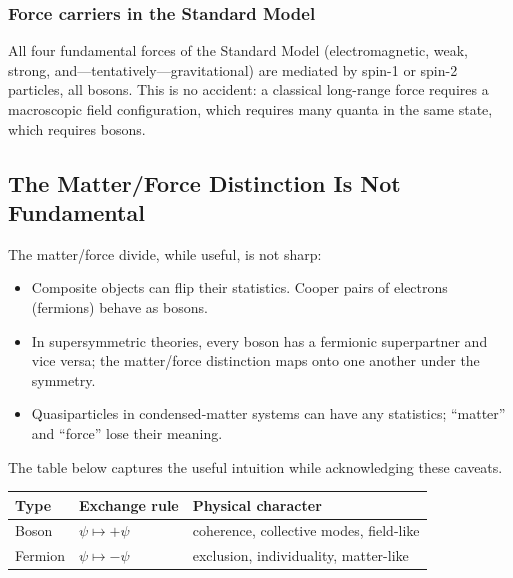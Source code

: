 \documentclass[11pt,a4paper]{article}
\begin{document}
\subsubsection{Force carriers in the Standard Model}

All four fundamental forces of the Standard Model (electromagnetic,
weak, strong, and---tentatively---gravitational) are mediated by spin-1 or
spin-2 particles, all bosons.  This is no accident: a classical long-range
force requires a macroscopic field configuration, which requires many quanta
in the same state, which requires bosons.

\subsection{The Matter/Force Distinction Is Not Fundamental}

The matter/force divide, while useful, is not sharp:
\begin{itemize}
  \item Composite objects can flip their statistics.  Cooper pairs of
        electrons (fermions) behave as bosons.
  \item In supersymmetric theories, every boson has a fermionic superpartner
        and vice versa; the matter/force distinction maps onto one another
        under the symmetry.
  \item Quasiparticles in condensed-matter systems can have any statistics;
        ``matter'' and ``force'' lose their meaning.
\end{itemize}

The table below captures the useful intuition while acknowledging these caveats.

\begin{center}
\renewcommand{\arraystretch}{1.35}
\begin{tabular}{lll}
  \toprule
  Type & Exchange rule & Physical character \\
  \midrule
  Boson   & $\psi \mapsto +\psi$ & coherence, collective modes, field-like \\
  Fermion & $\psi \mapsto -\psi$ & exclusion, individuality, matter-like \\
  \bottomrule
\end{tabular}
\end{center}

\end{document}

